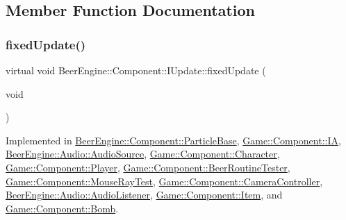 \subsection{Member Function Documentation}
\mbox{\label{class_beer_engine_1_1_component_1_1_i_update_a615c127a4729f73713e5eaeee538854b}} 
\subsubsection{\texorpdfstring{fixed\+Update()}{fixedUpdate()}}
{\footnotesize\ttfamily virtual void Beer\+Engine\+::\+Component\+::\+I\+Update\+::fixed\+Update (\begin{DoxyParamCaption}\item[{void}]{ }\end{DoxyParamCaption})\hspace{0.3cm}{\ttfamily [pure virtual]}}



Implemented in \mbox{\hyperlink{class_beer_engine_1_1_component_1_1_particle_base_a17d41a2cdf9174d5f86a6773c40e4d28}{Beer\+Engine\+::\+Component\+::\+Particle\+Base}}, \mbox{\hyperlink{class_game_1_1_component_1_1_i_a_a72b1e3aaf4686e0abef2e147d48f50e9}{Game\+::\+Component\+::\+IA}}, \mbox{\hyperlink{class_beer_engine_1_1_audio_1_1_audio_source_a248900a46e559e0e085b2cb98a766cf2}{Beer\+Engine\+::\+Audio\+::\+Audio\+Source}}, \mbox{\hyperlink{class_game_1_1_component_1_1_character_a19848759fb1837ca8dfeb2f10266fe9d}{Game\+::\+Component\+::\+Character}}, \mbox{\hyperlink{class_game_1_1_component_1_1_player_aacbb2bc974b4b81434abd49eb8f91999}{Game\+::\+Component\+::\+Player}}, \mbox{\hyperlink{class_game_1_1_component_1_1_beer_routine_tester_a01abf9a71d6c3598a3c9a8c0d26c1615}{Game\+::\+Component\+::\+Beer\+Routine\+Tester}}, \mbox{\hyperlink{class_game_1_1_component_1_1_mouse_ray_test_a71fe0d523b05a8d42c7c79101ea5ad18}{Game\+::\+Component\+::\+Mouse\+Ray\+Test}}, \mbox{\hyperlink{class_game_1_1_component_1_1_camera_controller_a0bdce3356bde07f277e0c58409c1f55d}{Game\+::\+Component\+::\+Camera\+Controller}}, \mbox{\hyperlink{class_beer_engine_1_1_audio_1_1_audio_listener_ad3d6b34a33582c17e2c7bc250e4e6937}{Beer\+Engine\+::\+Audio\+::\+Audio\+Listener}}, \mbox{\hyperlink{class_game_1_1_component_1_1_item_a3402bfd1509d12eb16fadbc37222406d}{Game\+::\+Component\+::\+Item}}, and \mbox{\hyperlink{class_game_1_1_component_1_1_bomb_af6598c095c2f36a2a1b1048eb84d6fc7}{Game\+::\+Component\+::\+Bomb}}.

